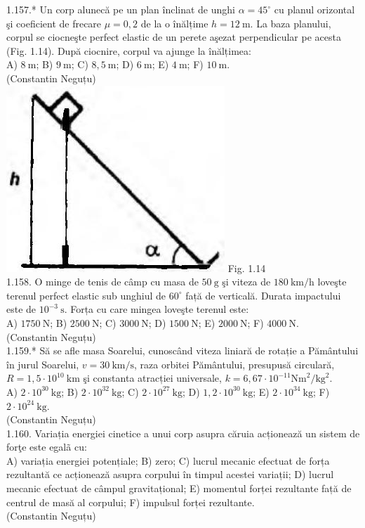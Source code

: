 1.157.* Un corp alunecă pe un plan înclinat de unghi $\alpha=45^{\circ}$ cu planul orizontal şi coeficient de frecare $\mu=0,2$ de la o înălțime $h=12 \mathrm{~m}$. La baza planului, corpul se ciocneşte perfect elastic de un perete aşezat perpendicular pe acesta (Fig. 1.14). După ciocnire, corpul va ajunge la înălțimea:\\ A) $8 \mathrm{~m}$; B) $9 \mathrm{~m}$; C) $8,5 \mathrm{~m}$; D) $6 \mathrm{~m}$; E) $4 \mathrm{~m}$; F) $10 \mathrm{~m}$.\\ (Constantin Neguțu)\\ \includegraphics[width=0.4\linewidth]{images/2025_07_01_5b3ff9fa0d508c8e9f17g-037} Fig. 1.14\\

1.158. O minge de tenis de câmp cu masa de $50 \mathrm{~g}$ şi viteza de $180 \mathrm{~km} / \mathrm{h}$ loveşte terenul perfect elastic sub unghiul de $60^{\circ}$ față de verticală. Durata impactului este de $10^{-3} \mathrm{~s}$. Forța cu care mingea loveşte terenul este:\\ A) $1750 \mathrm{~N}$; B) $2500 \mathrm{~N}$; C) $3000 \mathrm{~N}$; D) $1500 \mathrm{~N}$; E) $2000 \mathrm{~N}$; F) $4000 \mathrm{~N}$.\\ (Constantin Neguțu)\\

1.159.* Să se afle masa Soarelui, cunoscând viteza liniară de rotație a Pământului în jurul Soarelui, $v=30 \mathrm{~km} / \mathrm{s}$, raza orbitei Pământului, presupusă circulară, $R=1,5 \cdot 10^{10} \mathrm{~km}$ şi constanta atracției universale, $k=6,67 \cdot 10^{-11} \mathrm{Nm}^{2} / \mathrm{kg}^{2}$.\\ A) $2 \cdot 10^{30} \mathrm{~kg}$; B) $2 \cdot 10^{32} \mathrm{~kg}$; C) $2 \cdot 10^{27} \mathrm{~kg}$; D) $1,2 \cdot 10^{30} \mathrm{~kg}$; E) $2 \cdot 10^{34} \mathrm{~kg}$; F) $2 \cdot 10^{24} \mathrm{~kg}$.\\ (Constantin Neguțu)\\

1.160. Variația energiei cinetice a unui corp asupra căruia acționează un sistem de forţe este egalã cu:\\ A) variația energiei potențiale; B) zero; C) lucrul mecanic efectuat de forța rezultantă ce acționează asupra corpului în timpul acestei variații; D) lucrul mecanic efectuat de câmpul gravitațional; E) momentul forței rezultante față de centrul de masă al corpului; F) impulsul forței rezultante.\\ (Constantin Neguțu)\\

